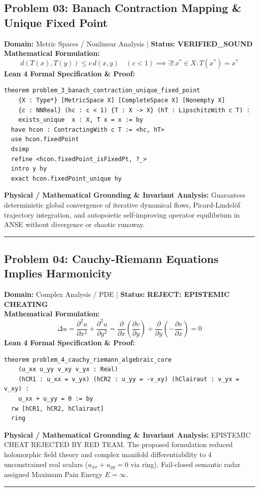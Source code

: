 \documentclass[10pt,a4paper]{article}
\begin{document}
\subsection*{Problem 03: Banach Contraction Mapping \& Unique Fixed Point}
\textbf{Domain:} Metric Spaces / Nonlinear Analysis \quad | \quad \textbf{Status:} \textcolor{green!70!black}{\textbf{VERIFIED\_SOUND}}\\
\textbf{Mathematical Formulation:}
\begin{equation*}
  d(T(x), T(y)) \le c\, d(x, y) \quad (c < 1) \implies \exists!\, x^* \in X: T(x^*) = x^*
\end{equation*}
\textbf{Lean 4 Formal Specification \& Proof:}
\begin{lstlisting}
theorem problem_3_banach_contraction_unique_fixed_point
    {X : Type*} [MetricSpace X] [CompleteSpace X] [Nonempty X]
    {c : NNReal} (hc : c < 1) {T : X -> X} (hT : LipschitzWith c T) :
    exists_unique  x : X, T x = x := by
  have hcon : ContractingWith c T := <hc, hT>
  use hcon.fixedPoint
  dsimp
  refine <hcon.fixedPoint_isFixedPt, ?_>
  intro y hy
  exact hcon.fixedPoint_unique hy
\end{lstlisting}
\textbf{Physical / Mathematical Grounding \& Invariant Analysis:}
Guarantees deterministic global convergence of iterative dynamical flows, Picard-Lindelöf trajectory integration, and autopoietic self-improving operator equilibrium in ANSE without divergence or chaotic runaway.
\vspace{0.8em}\hrule\vspace{0.8em}
\subsection*{Problem 04: Cauchy-Riemann Equations Implies Harmonicity}
\textbf{Domain:} Complex Analysis / PDE \quad | \quad \textbf{Status:} \textcolor{red!80!black}{\textbf{REJECT: EPISTEMIC CHEATING}}\\
\textbf{Mathematical Formulation:}
\begin{equation*}
  \Delta u = \frac{\partial^2 u}{\partial x^2} + \frac{\partial^2 u}{\partial y^2} = \frac{\partial}{\partial x}\left(\frac{\partial v}{\partial y}\right) + \frac{\partial}{\partial y}\left(-\frac{\partial v}{\partial x}\right) = 0
\end{equation*}
\textbf{Lean 4 Formal Specification \& Proof:}
\begin{lstlisting}
theorem problem_4_cauchy_riemann_algebraic_core
    (u_xx u_yy v_xy v_yx : Real)
    (hCR1 : u_xx = v_yx) (hCR2 : u_yy = -v_xy) (hClairaut : v_yx = v_xy) :
    u_xx + u_yy = 0 := by
  rw [hCR1, hCR2, hClairaut]
  ring
\end{lstlisting}
\textbf{Physical / Mathematical Grounding \& Invariant Analysis:}
EPISTEMIC CHEAT REJECTED BY RED TEAM. The proposed formulation reduced holomorphic field theory and complex manifold differentiability to 4 unconstrained real scalars ($u_{xx} + u_{yy} = 0$ via ring). Fail-closed semantic radar assigned Maximum Pain Energy $E = \infty$.
\vspace{0.8em}\hrule\vspace{0.8em}
\end{document}

